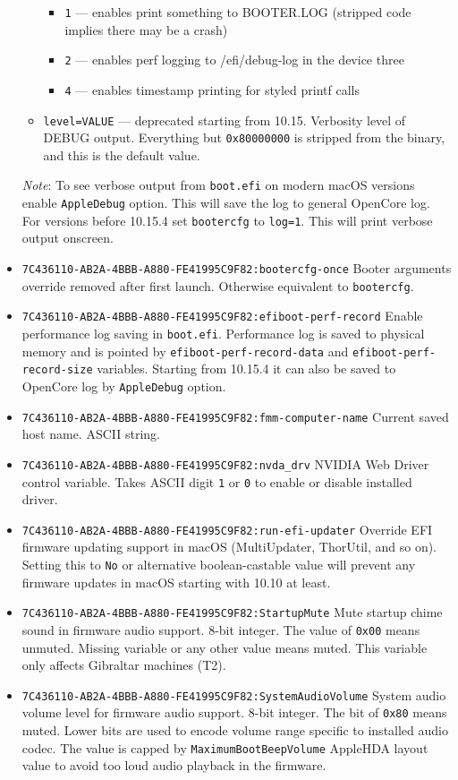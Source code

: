 \documentclass[]{article}
\begin{document}
\begin{itemize}
\begin{itemize}
  \begin{itemize}
  \item \texttt{1} --- enables print something to BOOTER.LOG (stripped code implies there
  may be a crash)
  \item \texttt{2} --- enables perf logging to /efi/debug-log in the device three
  \item \texttt{4} --- enables timestamp printing for styled printf calls
  \end{itemize}
  \item \texttt{level=VALUE}  --- deprecated starting from 10.15. Verbosity level of
  DEBUG output. Everything but \texttt{0x80000000} is stripped from the binary,
  and this is the default value.
  \end{itemize}

  \emph{Note}: To see verbose output from \texttt{boot.efi} on modern macOS versions
  enable \texttt{AppleDebug} option. This will save the log to general OpenCore log.
  For versions before 10.15.4 set \texttt{bootercfg} to \texttt{log=1}. This will
  print verbose output onscreen.
\item \texttt{7C436110-AB2A-4BBB-A880-FE41995C9F82:bootercfg-once}
  \break
  Booter arguments override removed after first launch. Otherwise equivalent to \texttt{bootercfg}.
\item
  \texttt{7C436110-AB2A-4BBB-A880-FE41995C9F82:efiboot-perf-record}
  \break
  Enable performance log saving in \texttt{boot.efi}. Performance log is saved to physical
  memory and is pointed by \texttt{efiboot-perf-record-data} and \texttt{efiboot-perf-record-size}
  variables. Starting from 10.15.4 it can also be saved to OpenCore log by \texttt{AppleDebug} option.
\item
  \texttt{7C436110-AB2A-4BBB-A880-FE41995C9F82:fmm-computer-name}
  \break
  Current saved host name. ASCII string.
\item
  \texttt{7C436110-AB2A-4BBB-A880-FE41995C9F82:nvda\_drv}
  \break
  NVIDIA Web Driver control variable. Takes ASCII digit \texttt{1} or \texttt{0}
  to enable or disable installed driver.
\item
  \texttt{7C436110-AB2A-4BBB-A880-FE41995C9F82:run-efi-updater}
  \break
  Override EFI firmware updating support in macOS (MultiUpdater, ThorUtil, and so on).
  Setting this to \texttt{No} or alternative boolean-castable value will prevent
  any firmware updates in macOS starting with 10.10 at least.
\item
  \texttt{7C436110-AB2A-4BBB-A880-FE41995C9F82:StartupMute}
  \break
  Mute startup chime sound in firmware audio support. 8-bit integer.
  The value of \texttt{0x00} means unmuted. Missing variable or any
  other value means muted. This variable only affects Gibraltar
  machines (T2).
\item
  \texttt{7C436110-AB2A-4BBB-A880-FE41995C9F82:SystemAudioVolume}
  \break
  System audio volume level for firmware audio support. 8-bit integer.
  The bit of \texttt{0x80} means muted. Lower bits are used to encode
  volume range specific to installed audio codec. The value is capped
  by \texttt{MaximumBootBeepVolume} AppleHDA layout value to avoid
  too loud audio playback in the firmware.
\end{itemize}
\end{document}
